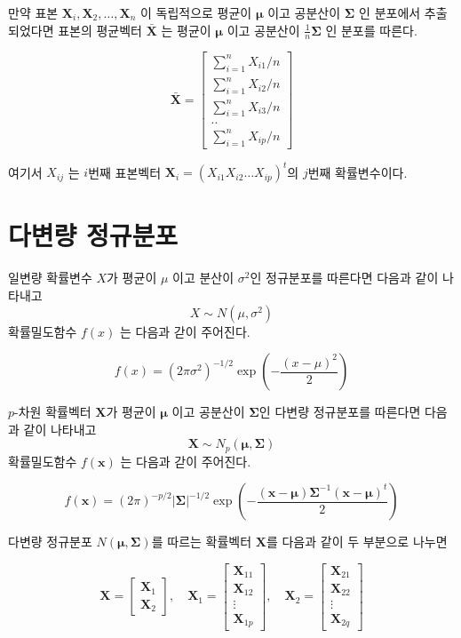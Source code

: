 \documentclass[
  11pt,
  a4paper,
  oneside]{scrbook}
\begin{document}
만약 표본 \(\pmb X_i, \pmb X_2, \dots, \pmb X_n\) 이 독립적으로 평균이
\(\pmb \mu\) 이고 공분산이 \(\pmb \Sigma\) 인 분포에서 추출되었다면
표본의 평균벡터 \(\bar {\pmb  X}\) 는 평균이 \(\pmb \mu\) 이고 공분산이
\(\frac{1}{n}\pmb \Sigma\) 인 분포를 따른다.

\[
\bar {\pmb X} =
  \begin{bmatrix}
\sum_{i=1}^n X_{i1} / n  \\
\sum_{i=1}^n X_{i2} / n \\
\sum_{i=1}^n X_{i3} / n \\
..  \\
\sum_{i=1}^n X_{ip} / n 
\end{bmatrix}
\]

여기서 \(X_{ij}\) 는 \(i\)번째 표본벡터
\(\pmb X_i =(X_{i1} X_{i2} \dots X_{ip})^t\)의 \(j\)번째 확률변수이다.

\section{다변량
정규분포}\label{uxb2e4uxbcc0uxb7c9-uxc815uxaddcuxbd84uxd3ec}

일변량 확률변수 \(X\)가 평균이 \(\mu\) 이고 분산이 \(\sigma^2\)인
정규분포를 따른다면 다음과 같이 나타내고 \[ X \sim N(\mu, \sigma^2 ) \]
확률밀도함수 \(f(x)\) 는 다음과 갇이 주어진다.

\[ f(x) = (2 \pi \sigma^2)^{-1/2} \exp \left ( - \frac{(x-\mu)^2}{2} \right ) \]

\(p\)-차원 확률벡터 \(\pmb X\)가 평균이 \(\pmb \mu\) 이고 공분산이
\(\pmb \Sigma\)인 다변량 정규분포를 따른다면 다음과 같이 나타내고
\[ \pmb X \sim N_p(\pmb \mu, \pmb \Sigma ) \] 확률밀도함수 \(f(\pmb x)\)
는 다음과 갇이 주어진다.

\[ f(\pmb x) = (2 \pi)^{-p/2} | \pmb \Sigma|^{-1/2} 
   \exp \left ( - \frac{(\pmb x-\pmb \mu) \pmb \Sigma^{-1}(\pmb x-\pmb \mu)^t}{2} \right ) \]

다변량 정규분포 \(N(\pmb \mu, \pmb \Sigma)\)를 따르는 확률벡터
\(\pmb X\)를 다음과 같이 두 부분으로 나누면

\[ 
  \pmb X = 
    \begin{bmatrix}
  \pmb X_1 \\
  \pmb X_2
  \end{bmatrix}, \quad
  \pmb X_1 = 
    \begin{bmatrix}
  \pmb X_{11} \\
  \pmb X_{12} \\
  \pmb \vdots \\
  \pmb X_{1p}
  \end{bmatrix}, \quad 
  \pmb X_2= 
    \begin{bmatrix}
  \pmb X_{21} \\
  \pmb X_{22} \\
  \pmb \vdots \\
  \pmb X_{2q}
  \end{bmatrix}
  \]
\end{document}
